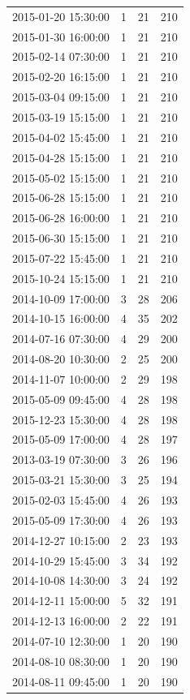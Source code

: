 \begin{tabular}{lrrr}
2015-01-20 15:30:00 & 1 & 21 & 210 \\
2015-01-30 16:00:00 & 1 & 21 & 210 \\
2015-02-14 07:30:00 & 1 & 21 & 210 \\
2015-02-20 16:15:00 & 1 & 21 & 210 \\
2015-03-04 09:15:00 & 1 & 21 & 210 \\
2015-03-19 15:15:00 & 1 & 21 & 210 \\
2015-04-02 15:45:00 & 1 & 21 & 210 \\
2015-04-28 15:15:00 & 1 & 21 & 210 \\
2015-05-02 15:15:00 & 1 & 21 & 210 \\
2015-06-28 15:15:00 & 1 & 21 & 210 \\
2015-06-28 16:00:00 & 1 & 21 & 210 \\
2015-06-30 15:15:00 & 1 & 21 & 210 \\
2015-07-22 15:45:00 & 1 & 21 & 210 \\
2015-10-24 15:15:00 & 1 & 21 & 210 \\
2014-10-09 17:00:00 & 3 & 28 & 206 \\
2014-10-15 16:00:00 & 4 & 35 & 202 \\
2014-07-16 07:30:00 & 4 & 29 & 200 \\
2014-08-20 10:30:00 & 2 & 25 & 200 \\
2014-11-07 10:00:00 & 2 & 29 & 198 \\
2015-05-09 09:45:00 & 4 & 28 & 198 \\
2015-12-23 15:30:00 & 4 & 28 & 198 \\
2015-05-09 17:00:00 & 4 & 28 & 197 \\
2013-03-19 07:30:00 & 3 & 26 & 196 \\
2015-03-21 15:30:00 & 3 & 25 & 194 \\
2015-02-03 15:45:00 & 4 & 26 & 193 \\
2015-05-09 17:30:00 & 4 & 26 & 193 \\
2014-12-27 10:15:00 & 2 & 23 & 193 \\
2014-10-29 15:45:00 & 3 & 34 & 192 \\
2014-10-08 14:30:00 & 3 & 24 & 192 \\
2014-12-11 15:00:00 & 5 & 32 & 191 \\
2014-12-13 16:00:00 & 2 & 22 & 191 \\
2014-07-10 12:30:00 & 1 & 20 & 190 \\
2014-08-10 08:30:00 & 1 & 20 & 190 \\
2014-08-11 09:45:00 & 1 & 20 & 190 \\

\end{tabular}
